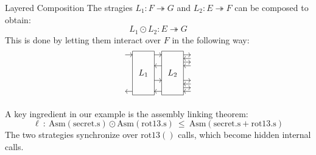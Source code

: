 \documentclass[aspectratio=1610,mathserif]{beamer}
\newcommand{\kw}[1]{\ensuremath{ \mathrm{#1} }}
\begin{document}
\begin{frame}{Layered Composition} %
  The stragies $L_1 : F \twoheadrightarrow G$ and
  $L_2 : E \twoheadrightarrow F$ can be composed to obtain:
  \[
     L_1 \odot L_2 : E \twoheadrightarrow G
  \]
  \pause
  This is done by letting them interact over $F$
  in the following way:
  \[
    \begin{tikzpicture}[yscale=0.15,xscale=0.30]
      \draw (1,-1) rectangle (4,11) node[midway] {$L_1$};
      \draw (5,-1) rectangle (8,11) node[midway] {$L_2$};
      \draw[->] (0,10) -- (1,10);
        \draw[->] (4,10) -- (5,10);
          \draw[->] (8,10) -- (9,10);
          \draw[->] (9,9) -- (8,9);
          \draw[->] (8,8) -- (9,8);
          \draw[->] (9,7) -- (8,7);
        \draw[->] (5,7) -- (4,7);
        \draw[->] (4,3) -- (5,3);
          \draw[->] (8,3) -- (9,3);
          \draw[->] (9,2) -- (8,2);
          \draw[->] (8,1) -- (9,1);
          \draw[->] (9,0) -- (8,0);
        \draw[->] (5,0) -- (4,0);
      \draw[->] (1,0) -- (0,0);
    \end{tikzpicture}
  \]

  \pause
  \begin{example}[Assembly linking]
    A key ingredient in our example is
    the assembly linking theorem:
    \[ \ell \::\:
       \kw{Asm}(\kw{secret.s}) \odot \kw{Asm}(\kw{rot13.s}) \:\le\:
       \kw{Asm}(\kw{secret.s} + \kw{rot13.s}) \]
    The two strategies synchronize over $\kw{rot13()}$ calls,
    which become hidden internal calls.
  \end{example}
\end{frame}
\end{document}
